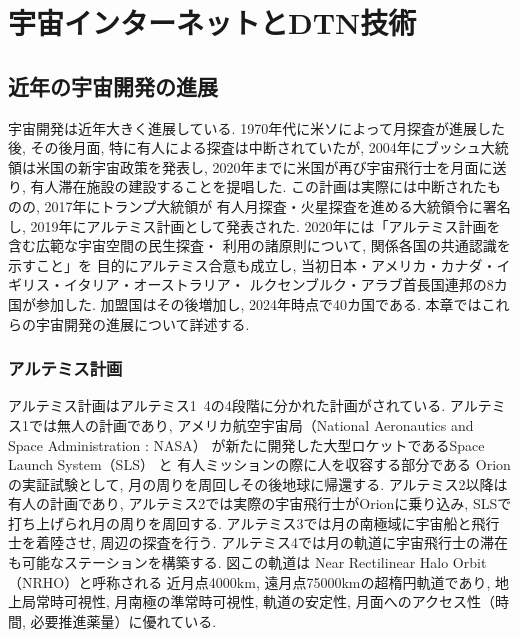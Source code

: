 \chapter{宇宙インターネットとDTN技術}
\label{chap:prerequisite_knowledge}

\section{近年の宇宙開発の進展}
宇宙開発は近年大きく進展している. 1970年代に米ソによって月探査が進展した後, 
その後月面, 特に有人による探査は中断されていたが, 
2004年にブッシュ大統領は米国の新宇宙政策を発表し, 
2020年までに米国が再び宇宙飛行士を月面に送り, 
有人滞在施設の建設することを提唱した\cite{久保田2009}.
この計画は実際には中断されたものの, 2017年にトランプ大統領が
有人月探査・火星探査を進める大統領令に署名し, 
2019年にアルテミス計画として発表された\cite{nasa2020}.
2020年には「アルテミス計画を含む広範な宇宙空間の民生探査・
利用の諸原則について, 関係各国の共通認識を示すこと」を
目的にアルテミス合意\cite{artemis_agreement1}も成立し, 
当初日本・アメリカ・カナダ・イギリス・イタリア・オーストラリア・
ルクセンブルク・アラブ首長国連邦の8カ国が参加した\cite{artemis_agreement2}. 
加盟国はその後増加し, 2024年時点で40カ国である\cite{artemis_agreement3}. 
本章ではこれらの宇宙開発の進展について詳述する. 

\subsection{アルテミス計画}
\label{section:月・火星の探査計画}
アルテミス計画はアルテミス1~4の4段階に分かれた計画がされている. 
アルテミス1では無人の計画であり, アメリカ航空宇宙局（National Aeronautics and Space Administration : NASA）
が新たに開発した大型ロケットであるSpace Launch System（SLS） と 有人ミッションの際に人を収容する部分である
Orionの実証試験として, 月の周りを周回しその後地球に帰還する. アルテミス2以降は有人の計画であり, 
アルテミス2では実際の宇宙飛行士がOrionに乗り込み, SLSで打ち上げられ月の周りを周回する. 
アルテミス3では月の南極域に宇宙船と飛行士を着陸させ, 周辺の探査を行う. 
アルテミス4では月の軌道に宇宙飛行士の滞在も可能なステーションを構築する. 
図この軌道は Near Rectilinear Halo Orbit （NRHO）と呼称される
近⽉点4000km, 遠⽉点75000kmの超楕円軌道であり, 
地上局常時可視性, 月南極の準常時可視性, 軌道の安定性, 
月面へのアクセス性（時間, 必要推進薬量）に優れている\cite{kiban_dai48}. 


